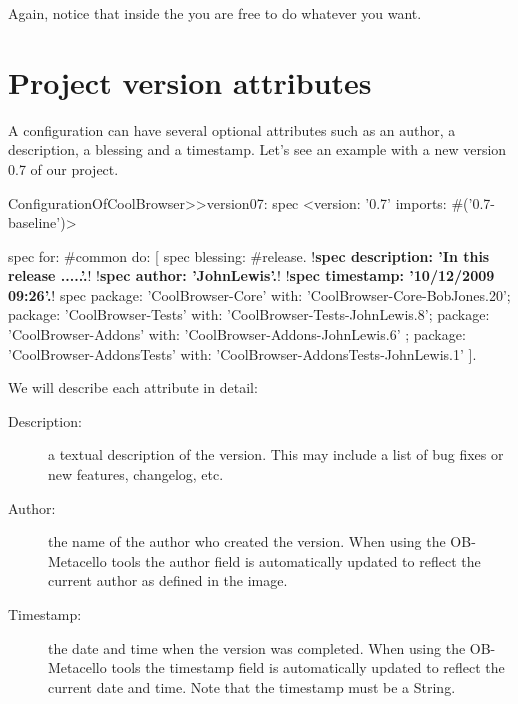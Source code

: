 \documentclass[a4paper,10pt,twoside]{book}
\begin{document}
Again, notice that inside the  you are free to do whatever you want.

\section{Project version attributes}
 
 
A configuration can have several optional attributes such as    
an author, a description, a blessing and a timestamp.  Let's see an example with a new version 0.7 of our project.
 
\begin{code}{}
ConfigurationOfCoolBrowser>>version07: spec 
       <version: '0.7' imports: #('0.7-baseline')>
       
       spec for: #common do: [
              spec blessing: #release.
              !\textbf{spec description: 'In this release .....'.}!
              !\textbf{spec author: 'JohnLewis'.}!
              !\textbf{spec timestamp: '10/12/2009 09:26'.}!
              spec 
                     package: 'CoolBrowser-Core' with: 'CoolBrowser-Core-BobJones.20';
                     package: 'CoolBrowser-Tests' with: 'CoolBrowser-Tests-JohnLewis.8';
                     package: 'CoolBrowser-Addons' with: 'CoolBrowser-Addons-JohnLewis.6' ;
                     package: 'CoolBrowser-AddonsTests' with: 'CoolBrowser-AddonsTests-JohnLewis.1' ].
\end{code}
 
We will describe each attribute in detail:
 
\begin{description}

\item[ Description:] a textual description of the version. This may include a list of bug fixes or new features, changelog, etc.
\item[  Author:] the name of the author who created the version. When using the OB-Metacello tools the author field is automatically updated to reflect the current author as defined in the image.
\item[  Timestamp:] the date and time when the version was completed. When using the OB-Metacello tools the timestamp field is automatically updated to reflect the current date and time. Note that the timestamp must be a String.

\end{description}
\end{document}
